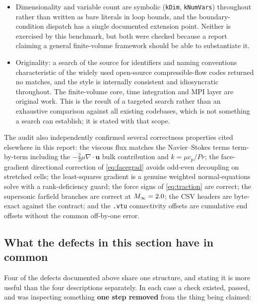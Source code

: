 \begin{itemize}
  a fixed structure, which is what allows one code path to handle a single-zone
  \texttt{PhysicalDimension} $=3$ airfoil mesh and a two-zone $=2$ cylinder mesh
  (\cref{sec:mesh}).
  \item Dimensionality and variable count are symbolic (\texttt{kDim},
  \texttt{kNumVars}) throughout rather than written as bare literals in loop bounds, and the
  boundary-condition dispatch has a single documented extension point. Neither is exercised
  by this benchmark, but both were checked because a report claiming a general
  finite-volume framework should be able to substantiate it.
  \item Originality: a search of the source for identifiers and naming conventions
  characteristic of the widely used open-source compressible-flow codes returned no
  matches, and the style is internally consistent and idiosyncratic throughout. The
  finite-volume core, time integration and MPI layer are original work. This is the
  result of a targeted search rather than an exhaustive comparison against all
  existing codebases, which is not something a search can establish; it is stated with
  that scope.
\end{itemize}

The audit also independently confirmed several correctness properties cited
elsewhere in this report: the viscous flux matches the Navier--Stokes terms
term-by-term including the $-\tfrac23\mu\nabla\!\cdot\!\mathbf{u}$ bulk
contribution and $k=\mu c_p/\mathit{Pr}$; the face-gradient directional
correction of \cref{eq:facegrad} avoids odd-even decoupling on stretched cells;
the least-squares gradient is a genuine weighted normal-equations solve with a
rank-deficiency guard; the force signs of \cref{eq:traction} are correct; the
supersonic farfield branches are correct at $M_\infty=2.0$; the CSV headers are
byte-exact against the contract; and the \texttt{.vtu} connectivity offsets are
cumulative end offsets without the common off-by-one error.

\subsection{What the defects in this section have in common}
\label{sec:onelesson}

Four of the defects documented above share one structure, and stating it is more useful
than the four descriptions separately. In each case a check existed, passed, and was
inspecting something \textbf{one step removed} from the thing being claimed:

